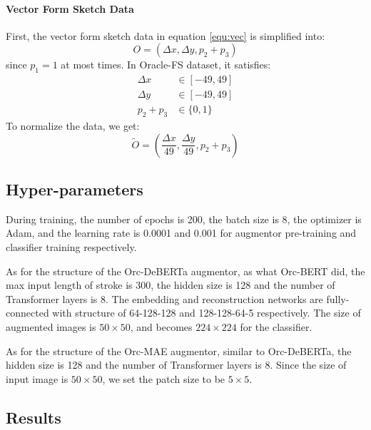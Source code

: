 \documentclass{article}
\begin{document}
\paragraph{Vector Form Sketch Data}
First, the vector form sketch data in equation \ref{equ:vec} is simplified into:
\begin{equation*}
	O = (\Delta x, \Delta y, p_2 + p_3) 
\end{equation*} 
since $ p_1 = 1 $ at most times.
In Oracle-FS dataset, it satisfies:
\begin{align*}
	\Delta x &\in [-49, 49] \\
	\Delta y &\in [-49, 49] \\
	p_2 + p_3 &\in \{0, 1\}
\end{align*}
To normalize the data, we get:
\begin{equation*}
	\tilde{O} = 
	(\frac{\Delta x}{49}, \frac{\Delta y}{49},	p_2 + p_3) 
\end{equation*} 

\subsection{Hyper-parameters}

During training, the number of epochs is 200, the batch size is 8, the optimizer is Adam, and the learning rate is 0.0001 and 0.001 for augmentor pre-training and classifier training respectively.

As for the structure of the Orc-DeBERTa augmentor, as what Orc-BERT did, the max input length of stroke is 300, the hidden size is 128 and the number of Transformer layers is 8. The embedding and reconstruction networks are fully-connected with structure of 64-128-128 and 128-128-64-5 respectively. The size of augmented images is $ 50 \times 50 $, and becomes $ 224 \times 224 $ for the classifier.

As for the structure of the Orc-MAE augmentor, similar to Orc-DeBERTa, the hidden size is 128 and the number of Transformer layers is 8. Since the size of input image is $ 50 \times 50 $, we set the patch size to be $ 5 \times 5 $.


\subsection{Results}
\end{document}
